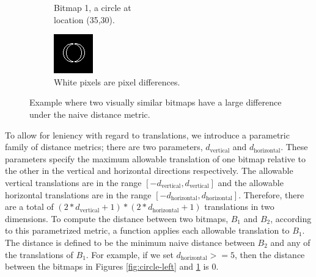 \documentclass[12pt]{article}
\begin{document}
\begin{figure}
\begin{subfigure}[b]{.3\linewidth}
\caption{Bitmap 1, a circle at \\ location (35,30).}
\label{fig:circle-right}
\end{subfigure}
\begin{subfigure}[b]{.3\linewidth}
\includegraphics[width=\linewidth]{circle-diff.png}
\caption{White pixels are pixel differences.}
\label{fig:circle-diff}
\end{subfigure}
\caption{Example where two visually similar bitmaps have a large difference under the naive distance metric.}
\label{fig:naive-distance-problem}
\end{figure}


To allow for leniency with regard to translations, we introduce a parametric family of distance metrics; there are two parameters, $d_{\text{vertical}}$ and $d_{\text{horizontal}}$.  These parameters specify the maximum allowable translation of one bitmap relative to the other in the vertical and horizontal directions respectively.  The allowable vertical translations are in the range $[-d_{\text{vertical}}, d_{\text{vertical}}]$ and the allowable horizontal translations are in the range $[-d_{\text{horizontal}}, d_{\text{horizontal}}]$.  Therefore, there are a total of $(2*d_{\text{vertical}}+1)*(2*d_{\text{horizontal}}+1)$ translations in two dimensions.  To compute the distance between two bitmaps, $B_1$ and $B_2$, according to this parametrized metric, a function applies each allowable translation to $B_1$.  The distance is defined to be the minimum naive distance between $B_2$ and any of the translations of $B_1$.  For example, if we set $d_{\text{horizontal}} >= 5$, then the distance between the bitmaps in Figures \ref{fig:circle-left} and \ref{fig:circle-right} is 0.
\end{document}
